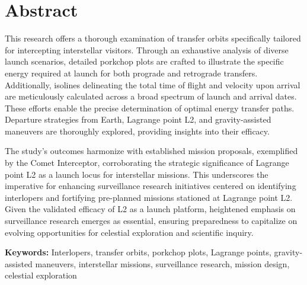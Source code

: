\chapter*{Abstract}

This research offers a thorough examination of transfer orbits specifically
tailored for intercepting interstellar visitors. Through an exhaustive analysis
of diverse launch scenarios, detailed porkchop plots are crafted to illustrate
the specific energy required at launch for both prograde and retrograde
transfers. Additionally, isolines delineating the total time of flight and
velocity upon arrival are meticulously calculated across a broad spectrum of
launch and arrival dates. These efforts enable the precise determination of
optimal energy transfer paths. Departure strategies from Earth, Lagrange point
L2, and gravity-assisted maneuvers are thoroughly explored, providing insights
into their efficacy.

The study's outcomes harmonize with established mission proposals, exemplified
by the Comet Interceptor, corroborating the strategic significance of Lagrange
point L2 as a launch locus for interstellar missions. This underscores the
imperative for enhancing surveillance research initiatives centered on
identifying interlopers and fortifying pre-planned missions stationed at
Lagrange point L2. Given the validated efficacy of L2 as a launch platform,
heightened emphasis on surveillance research emerges as essential, ensuring
preparedness to capitalize on evolving opportunities for celestial exploration
and scientific inquiry.


\vspace{4cm}
\textbf{Keywords:} Interlopers, transfer orbits, porkchop plots, Lagrange points,
gravity-assisted maneuvers, interstellar missions, surveillance research,
mission design, celestial exploration
